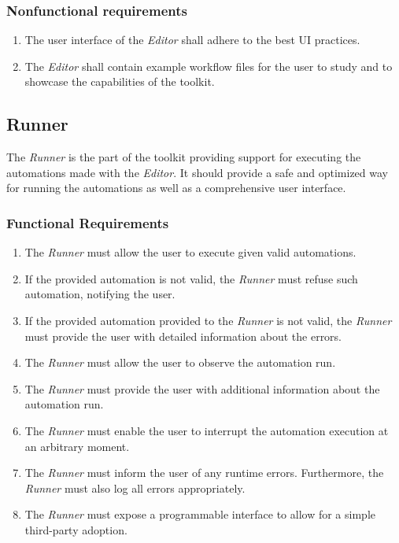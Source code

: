 \subsubsection{Nonfunctional requirements}

\begin{enumerate}[label=\thesubsection.2.\arabic*]
    \item The user interface of the \textit{Editor} shall adhere to the best \ac{UI} practices.
    \item The \textit{Editor} shall contain example workflow files for the user to study and to showcase the capabilities of the toolkit.
\end{enumerate}

\clearpage
\subsection{Runner}

The \textit{Runner} is the part of the toolkit providing support for executing the automations made with the \textit{Editor}.
It should provide a safe and optimized way for running the automations as well as a comprehensive user interface.

\subsubsection{Functional Requirements}

\begin{enumerate}[label=\thesubsection.1.\arabic*]
    \item The \textit{Runner} must allow the user to execute given valid automations. 
    \item If the provided automation is not valid, the \textit{Runner} must refuse such automation, notifying the user.
    \item If the provided automation provided to the \textit{Runner} is not valid, 
    the \textit{Runner} must provide the user with detailed information about the errors.
    \item The \textit{Runner} must allow the user to observe the automation run.
    \item The \textit{Runner} must provide the user with additional information about the automation run. 
    \item The \textit{Runner} must enable the user to interrupt the automation execution at an arbitrary moment.
    \item The \textit{Runner} must inform the user of any runtime errors. 
    Furthermore, the \textit{Runner} must also log all errors appropriately.
    \item The \textit{Runner} must expose a programmable interface to allow for a simple third-party adoption.
\end{enumerate}

